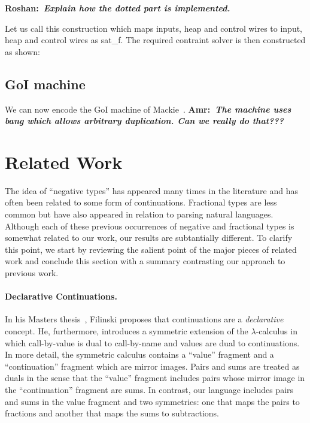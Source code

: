 \documentclass[preprint]{sigplanconf}
\newcommand{\xcomment}[2]{\textbf{#1:~\textsl{#2}}}
\newcommand{\amr}[1]{\xcomment{Amr}{#1}}
\newcommand{\roshan}[1]{\xcomment{Roshan}{#1}}
\begin{document}
\roshan{Explain how the dotted part is implemented.}

Let us call this construction which maps inputs, heap and control
wires to input, heap and control wires as {{sat_f}}. The required
contraint solver is then constructed as shown:

\begin{center}
\end{center}  

\subsection{GoI machine}

We can now encode the GoI machine of
Mackie~\cite{Mackie2011,DBLP:conf/popl/Mackie95}. \amr{The machine uses bang
  which allows arbitrary duplication. Can we really do that???}

\section{Related Work} 
\label{sec:related}

The idea of ``negative types'' has appeared many times in the literature and
has often been related to some form of continuations. Fractional types are
less common but have also appeared in relation to parsing natural
languages. Although each of these previous occurrences of negative and
fractional types is somewhat related to our work, our results are
subtantially different. To clarify this point, we start by reviewing the
salient point of the major pieces of related work and conclude this section
with a summary contrasting our approach to previous work.

\paragraph*{Declarative Continuations.} 
In his Masters thesis~\cite{Filinski:1989:DCI:648332.755574}, Filinski
proposes that continuations are a \emph{declarative} concept. He,
furthermore, introduces a symmetric extension of the $\lambda$-calculus in
which call-by-value is dual to call-by-name and values are dual to
continuations. In more detail, the symmetric calculus contains a ``value''
fragment and a ``continuation'' fragment which are mirror images. Pairs and
sums are treated as duals in the sense that the ``value'' fragment includes
pairs whose mirror image in the ``continuation'' fragment are sums. In
contrast, our language includes pairs and sums in the value fragment and two
symmetries: one that maps the pairs to fractions and another that maps the
sums to subtractions.
\end{document}
